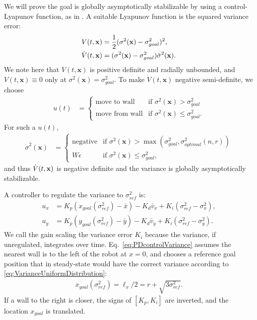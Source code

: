 We will prove the goal is globally asymptotically stabilizable by using a control-Lyapunov function, as in \cite{Lyapunov1992}.  A suitable Lyapunov function is the squared variance error:
\begin{align}
\label{eq:LyapunovVariance}
V(t,\bf{x})  &= \frac{1}{2} (\sigma^2(\mathbf{x}) - \sigma^2_{goal})^2,\nonumber\\
\dot{V}(t,\bf{x}) &= (\sigma^2(\mathbf{x})-\sigma^2_{goal})\dot{\sigma}^2(\mathbf{x}).
\end{align}
We note here that $V(t,\mathbf{x})$ is positive definite and radially unbounded, and $V(t,\mathbf{x}) \equiv 0$ only at $\sigma^2(\mathbf{x}) = \sigma^2_{goal}$.
To make $\dot{V}(t,\mathbf{x})$ negative semi-definite, we choose
\begin{align}\label{eq:controlVariance}
u(t) &=   \begin{cases}
	 \mbox{move to wall} &\mbox{if } \sigma^2(\mathbf{x})>\sigma^2_{goal} \\ 
	 \mbox{move from wall} & \mbox{if } \sigma^2(\mathbf{x}) \le \sigma^2_{goal}.
\end{cases} 
\end{align}
 For such a $u(t)$,
 \begin{align}
\dot{\sigma}^2(\mathbf{x}) &=   \begin{cases}
	 \mbox{negative} &\mbox{if } \sigma^2(\mathbf{x})> \max(\sigma^2_{goal}, \sigma^2_{optimal}(n,r))  \\ 
	 W \epsilon & \mbox{if } \sigma^2(\mathbf{x}) \le \sigma^2_{goal},
\end{cases} 
\end{align} and thus
$\dot{V}(t,{\bf x})$ is negative definite and the variance is globally asymptotically stabilizable.%



A  controller to regulate the variance to $\sigma^2_{ref}$ is:
\begin{align}
u_x &= K_{p}(x_{goal}(\sigma^2_{ref}) - \bar{x}) - K_{d}\bar{v}_x + K_{i}(\sigma^2_{ref}-\sigma^2_{x}), \nonumber\\
u_y &= K_{p}(y_{goal}(\sigma^2_{ref})  - \bar{y}) - K_{d}\bar{v}_y + K_{i}(\sigma^2_{ref}-\sigma^2_{y}).  \label{eq:PDcontrolVariance}
\end{align}
We call the gain scaling the variance error $K_i$ because the variance, if unregulated, integrates over time.
Eq.~\eqref{eq:PDcontrolVariance} assumes the nearest wall is to the left of the robot at $x=0$, and chooses a reference goal position that in steady-state would have the correct variance according to \eqref{eq:VarianceUniformDistribution}:
\begin{align}
x_{goal}(\sigma^2_{ref}) = \ell_x/2 = r + \sqrt{3\sigma^2_{ref}}.
\end{align}
 If a wall to the right is closer, the signs of $[K_p,K_i]$ are inverted, and the location $x_{goal}$ is translated.  


